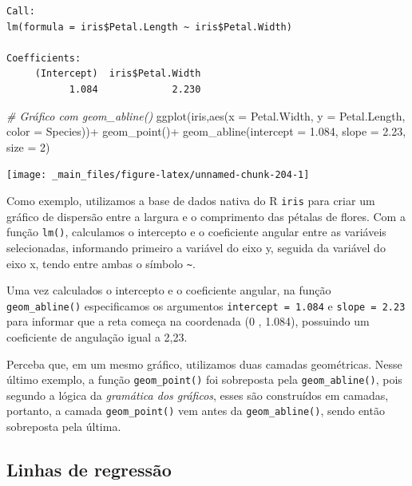 \documentclass[
  brazilian,
]{book}
\newenvironment{Shaded}{\begin{snugshade}}{\end{snugshade}}
\newcommand{\AttributeTok}[1]{\textcolor[rgb]{0.77,0.63,0.00}{#1}}
\newcommand{\CommentTok}[1]{\textcolor[rgb]{0.56,0.35,0.01}{\textit{#1}}}
\newcommand{\DecValTok}[1]{\textcolor[rgb]{0.00,0.00,0.81}{#1}}
\newcommand{\FloatTok}[1]{\textcolor[rgb]{0.00,0.00,0.81}{#1}}
\newcommand{\FunctionTok}[1]{\textcolor[rgb]{0.00,0.00,0.00}{#1}}
\newcommand{\NormalTok}[1]{#1}
\newcommand{\SpecialCharTok}[1]{\textcolor[rgb]{0.00,0.00,0.00}{#1}}
\begin{document}
\begin{verbatim}
Call:
lm(formula = iris$Petal.Length ~ iris$Petal.Width)

Coefficients:
     (Intercept)  iris$Petal.Width  
           1.084             2.230  
\end{verbatim}

\begin{Shaded}
\begin{Highlighting}[]
\CommentTok{\# Gráfico com geom\_abline()}
\FunctionTok{ggplot}\NormalTok{(iris,}\FunctionTok{aes}\NormalTok{(}\AttributeTok{x =}\NormalTok{ Petal.Width,}
                 \AttributeTok{y =}\NormalTok{ Petal.Length,}
                 \AttributeTok{color =}\NormalTok{ Species))}\SpecialCharTok{+}
  \FunctionTok{geom\_point}\NormalTok{()}\SpecialCharTok{+}
  \FunctionTok{geom\_abline}\NormalTok{(}\AttributeTok{intercept =} \FloatTok{1.084}\NormalTok{,}
              \AttributeTok{slope =} \FloatTok{2.23}\NormalTok{,}
              \AttributeTok{size =} \DecValTok{2}\NormalTok{)}
\end{Highlighting}
\end{Shaded}

\begin{center}\texttt{[image: \_main\_files/figure-latex/unnamed-chunk-204-1]} \end{center}

Como exemplo, utilizamos a base de dados nativa do R \texttt{iris} para criar um gráfico de dispersão entre a largura e o comprimento das pétalas de flores. Com a função \texttt{lm()}, calculamos o intercepto e o coeficiente angular entre as variáveis selecionadas, informando primeiro a variável do eixo y, seguida da variável do eixo x, tendo entre ambas o símbolo \texttt{\textasciitilde{}}.

Uma vez calculados o intercepto e o coeficiente angular, na função \texttt{geom\_abline()} especificamos os argumentos \texttt{intercept\ =\ 1.084} e \texttt{slope\ =\ 2.23} para informar que a reta começa na coordenada (0 , 1.084), possuindo um coeficiente de angulação igual a 2,23.

Perceba que, em um mesmo gráfico, utilizamos duas camadas geométricas. Nesse último exemplo, a função \texttt{geom\_point()} foi sobreposta pela \texttt{geom\_abline()}, pois segundo a lógica da \emph{gramática dos gráficos}, esses são construídos em camadas, portanto, a camada \texttt{geom\_point()} vem antes da \texttt{geom\_abline()}, sendo então sobreposta pela última.

\hypertarget{linhas-de-regressuxe3o}{%
\subsection{Linhas de regressão}\label{linhas-de-regressuxe3o}}
\end{document}
